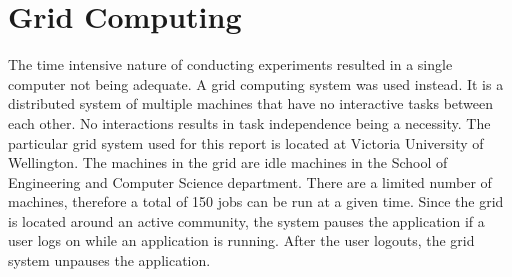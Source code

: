 \section{Grid Computing}
The time intensive nature of conducting experiments resulted in a single computer not being adequate. A grid computing system was used instead. It is a distributed system of multiple machines that have no interactive tasks between each other. No interactions results in task independence being a necessity. The particular grid system used for this report is located at Victoria University of Wellington. The machines in the grid are idle machines in the School of Engineering and Computer Science department. There are a limited number of machines, therefore a total of 150 jobs can be run at a given time. Since the grid is located around an active community, the system pauses the application if a user logs on while an application is running. After the user logouts, the grid system unpauses the application.